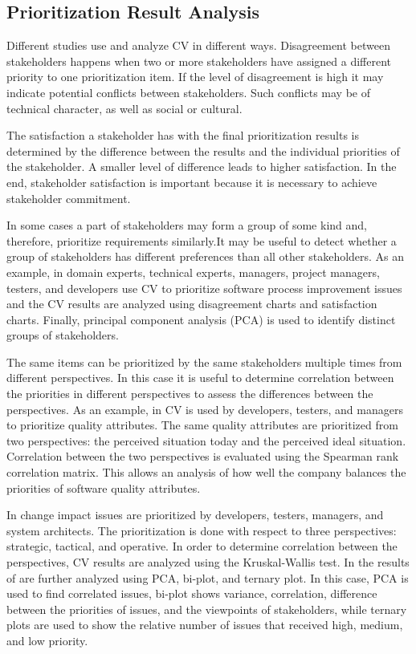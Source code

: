 \subsection{Prioritization Result Analysis}

Different studies use and analyze CV in different ways. Disagreement
between stakeholders happens when two or more stakeholders have assigned
a different priority to one prioritization item. If the level of disagreement
is high it may indicate potential conflicts between stakeholders.
Such conflicts may be of technical character, as well as social or cultural.

The satisfaction a stakeholder has with the final prioritization results is
determined by the difference between the results and the individual priorities
of the stakeholder. A smaller level of difference leads to higher satisfaction.
In the end, stakeholder satisfaction is important because it is necessary to achieve
stakeholder commitment.

In some cases a part of stakeholders may form a group of some kind and, therefore, prioritize
requirements similarly.It may be useful
to detect whether a group of stakeholders has different preferences
than all other stakeholders. As an example, in \cite{Pettersson2008} domain experts,
technical experts, managers, project managers, testers, and developers
use CV to prioritize software process improvement issues and the CV results
are analyzed using disagreement charts and satisfaction charts.
Finally, principal component analysis (PCA) is used to identify distinct
groups of stakeholders.

The same items can be prioritized by the same stakeholders multiple times
from different perspectives. In this case it is useful to determine correlation between
the priorities in different perspectives to assess the differences
between the perspectives. As an example, in \cite{Barney2009b} CV is used by developers,
testers, and managers to prioritize quality attributes. The same quality
attributes are prioritized from two perspectives: the perceived situation
today and the perceived ideal situation. Correlation between the two perspectives
is evaluated using the Spearman rank correlation matrix. This allows an analysis of
how well the company balances the priorities of software quality attributes.

In \cite{Jonsson2005} change impact issues are prioritized by developers,
testers, managers, and system architects. The prioritization is done
with respect to three perspectives: strategic, tactical, and operative.
In order to determine correlation between the perspectives, CV results are
analyzed using the Kruskal-Wallis test. In \cite{Chatzipetrou2010} the
results of \cite{Jonsson2005} are further analyzed using PCA, bi-plot, and
ternary plot. In this case, PCA is used to find correlated issues, 
bi-plot shows variance, correlation, difference between
the priorities of issues, and the viewpoints of stakeholders, while ternary
plots are used to show the relative number of issues that received high,
medium, and low priority.

